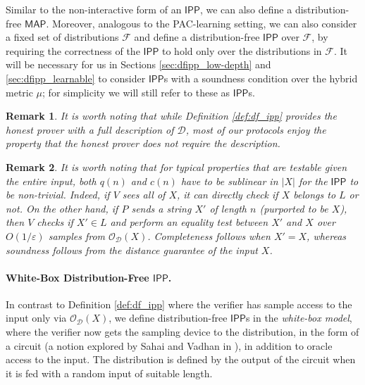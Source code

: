 \documentclass[10pt,a4paper]{article}
\newtheorem{remark}{Remark}
\newcommand{\IPP}{\mathsf{IPP}}
\newcommand{\MAP}{\mathsf{MAP}}
\newcommand{\sD}{\mathcal{D}}
\newcommand{\sF}{\mathcal{F}}
\begin{document}
\noindent Similar to the non-interactive form of an $\IPP$, we can also define a distribution-free $\MAP$. Moreover, analogous to the PAC-learning setting, we can also consider a fixed set of distributions $\sF$ and define a distribution-free $\IPP$ over $\sF$, by requiring the correctness of the $\IPP$ to hold only over the distributions in $\sF$. It will be necessary for us in Sections \ref{sec:dfipp_low-depth} and \ref{sec:dfipp_learnable} to consider $\IPP$s with a soundness condition over the hybrid metric $\mu$; for simplicity we will still refer to these as $\IPP$s. 

\begin{remark}
    It is worth noting that while Definition \ref{def:df_ipp} provides the honest prover with a full description of $\sD$, most of our protocols enjoy the property that the honest prover does not require the description. 
\end{remark}

\begin{remark}
It is worth noting that for typical properties that are testable given the entire input, both $q(n)$ and $c(n)$ have to be sublinear in $\vert X \vert$ for the $\IPP$ to be non-trivial. Indeed, if $V$ sees all of $X$, it can directly check if $X$ belongs to $L$ or not. On the other hand, if $P$ sends a string $X'$ of length $n$ (purported to be $X$), then $V$ checks if $X' \in L$ and perform an equality test between $X'$ and $X$ over $O(1/\varepsilon)$ samples from $\mathcal{O}_\sD(X)$. Completeness follows when $X' = X$, whereas soundness follows from the distance guarantee of the input $X$. 
\end{remark}

\paragraph{White-Box Distribution-Free $\IPP$.}
In contrast to Definition \ref{def:df_ipp} where the verifier has sample access to the input only via $\mathcal{O}_\sD(X)$, we define distribution-free $\IPP$s in the \textit{white-box model}, where the verifier now gets the sampling device to the distribution, in the form of a circuit (a notion explored by Sahai and Vadhan in \cite{SV97}), in addition to oracle access to the input. The distribution is defined by the output of the circuit when it is fed with a random input of suitable length. 
\end{document}
